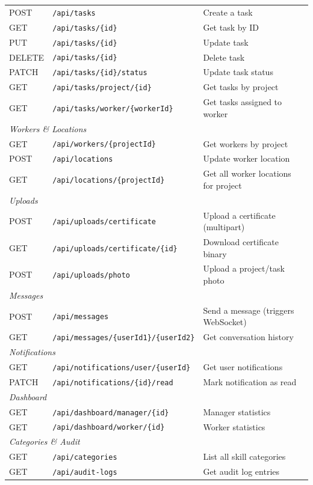 \documentclass[12pt,a4paper]{article}
\begin{document}
\begin{longtable}{lll}
POST   & \texttt{/api/tasks}                             & Create a task \\
GET    & \texttt{/api/tasks/\{id\}}                      & Get task by ID \\
PUT    & \texttt{/api/tasks/\{id\}}                      & Update task \\
DELETE & \texttt{/api/tasks/\{id\}}                      & Delete task \\
PATCH  & \texttt{/api/tasks/\{id\}/status}               & Update task status \\
GET    & \texttt{/api/tasks/project/\{id\}}              & Get tasks by project \\
GET    & \texttt{/api/tasks/worker/\{workerId\}}         & Get tasks assigned to worker \\
\midrule
\multicolumn{3}{l}{\textit{Workers \& Locations}} \\
GET    & \texttt{/api/workers/\{projectId\}}             & Get workers by project \\
POST   & \texttt{/api/locations}                         & Update worker location \\
GET    & \texttt{/api/locations/\{projectId\}}           & Get all worker locations for project \\
\midrule
\multicolumn{3}{l}{\textit{Uploads}} \\
POST   & \texttt{/api/uploads/certificate}               & Upload a certificate (multipart) \\
GET    & \texttt{/api/uploads/certificate/\{id\}}        & Download certificate binary \\
POST   & \texttt{/api/uploads/photo}                     & Upload a project/task photo \\
\midrule
\multicolumn{3}{l}{\textit{Messages}} \\
POST   & \texttt{/api/messages}                          & Send a message (triggers WebSocket) \\
GET    & \texttt{/api/messages/\{userId1\}/\{userId2\}}  & Get conversation history \\
\midrule
\multicolumn{3}{l}{\textit{Notifications}} \\
GET    & \texttt{/api/notifications/user/\{userId\}}     & Get user notifications \\
PATCH  & \texttt{/api/notifications/\{id\}/read}         & Mark notification as read \\
\midrule
\multicolumn{3}{l}{\textit{Dashboard}} \\
GET    & \texttt{/api/dashboard/manager/\{id\}}          & Manager statistics \\
GET    & \texttt{/api/dashboard/worker/\{id\}}           & Worker statistics \\
\midrule
\multicolumn{3}{l}{\textit{Categories \& Audit}} \\
GET    & \texttt{/api/categories}                        & List all skill categories \\
GET    & \texttt{/api/audit-logs}                        & Get audit log entries \\
\bottomrule
\end{longtable}
\end{document}
